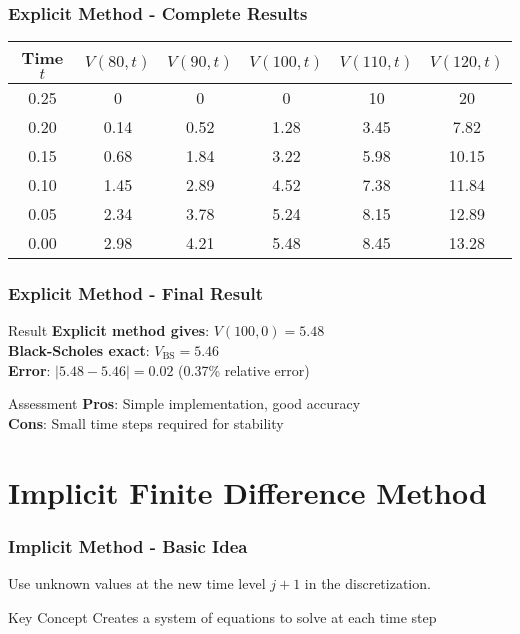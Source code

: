 \documentclass[aspectratio=169]{beamer}
\begin{document}
\begin{frame}
\frametitle{Explicit Method - Complete Results}
\begin{center}
\begin{tabular}{c|c|c|c|c|c}
Time \(t\) & \(V(80,t)\) & \(V(90,t)\) & \(V(100,t)\) & \(V(110,t)\) & \(V(120,t)\) \\
\hline
0.25 & 0 & 0 & 0 & 10 & 20 \\
0.20 & 0.14 & 0.52 & 1.28 & 3.45 & 7.82 \\
0.15 & 0.68 & 1.84 & 3.22 & 5.98 & 10.15 \\
0.10 & 1.45 & 2.89 & 4.52 & 7.38 & 11.84 \\
0.05 & 2.34 & 3.78 & 5.24 & 8.15 & 12.89 \\
0.00 & 2.98 & 4.21 & 5.48 & 8.45 & 13.28 \\
\end{tabular}
\end{center}
\end{frame}

\begin{frame}
\frametitle{Explicit Method - Final Result}
\begin{block}{Result}
\textbf{Explicit method gives}: \(V(100, 0) = 5.48\)\\
\textbf{Black-Scholes exact}: \(V_{\text{BS}} = 5.46\)\\
\textbf{Error}: \(|5.48 - 5.46| = 0.02\) (0.37\% relative error)
\end{block}

\begin{block}{Assessment}
\textbf{Pros}: Simple implementation, good accuracy\\
\textbf{Cons}: Small time steps required for stability
\end{block}
\end{frame}

\section{Implicit Finite Difference Method}

\begin{frame}
\frametitle{Implicit Method - Basic Idea}
Use unknown values at the new time level \(j+1\) in the discretization.

\begin{block}{Key Concept}
Creates a system of equations to solve at each time step
\end{block}
\end{frame}
\end{document}
